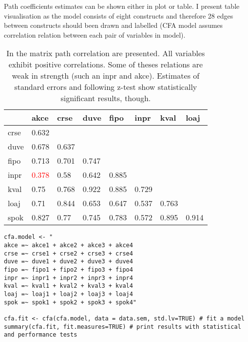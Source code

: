 \documentclass[10pt,a4paper]{article}
\begin{document}
Path coefficients estimates can be shown either in plot or table. I present table visualisation as the model consists of eight constructs and therefore 28 edges between constructs should been drawn and labelled (CFA model assumes correlation relation between each pair of variables in model). 

\begin{table}[htbp]
  \centering
  \caption{In the matrix path correlation are presented. All variables exhibit positive correlations. Some of theses relations are weak in strength (such an inpr and akce). Estimates of standard errors and following z-test show statistically significant results, though.}
    \begin{tabular}{l|lllllll}
          & akce  & crse  & duve  & fipo  & inpr  & kval  & loaj \\\hline
    crse  & 0.632 &       &       &       &       &       &  \\
    duve  & 0.678 & 0.637 &       &       &       &       &  \\
    fipo  & 0.713 & 0.701 & 0.747 &       &       &       &  \\
    inpr  & \textcolor{Red}{0.378} & 0.58  & 0.642 & 0.885 &       &       &  \\
    kval  & 0.75  & 0.768 & 0.922 & 0.885 & 0.729 &       &  \\
    loaj  & 0.71  & 0.844 & 0.653 & 0.647 & 0.537 & 0.763 &  \\
    spok  & 0.827 & 0.77  & 0.745 & 0.783 & 0.572 & 0.895 & 0.914 \\
    \end{tabular}%
  \label{t:cfa_paths}%
\end{table}%

\begin{lstlisting}
cfa.model <- "
akce =~ akce1 + akce2 + akce3 + akce4
crse =~ crse1 + crse2 + crse3 + crse4
duve =~ duve1 + duve2 + duve3 + duve4
fipo =~ fipo1 + fipo2 + fipo3 + fipo4
inpr =~ inpr1 + inpr2 + inpr3 + inpr4
kval =~ kval1 + kval2 + kval3 + kval4
loaj =~ loaj1 + loaj2 + loaj3 + loaj4
spok =~ spok1 + spok2 + spok3 + spok4"

cfa.fit <- cfa(cfa.model, data = data.sem, std.lv=TRUE) # fit a model
summary(cfa.fit, fit.measures=TRUE) # print results with statistical and performance tests
\end{lstlisting}
\end{document}
